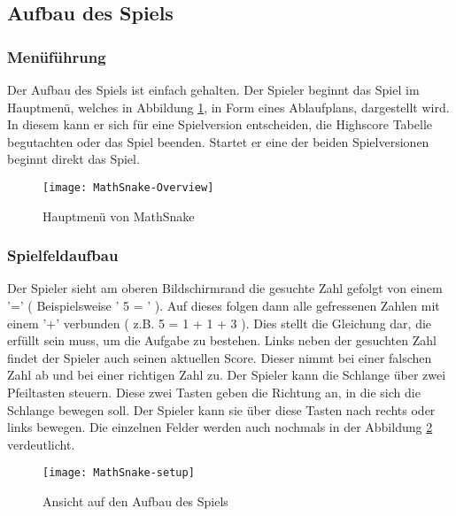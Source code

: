\subsection{Aufbau des Spiels}
\subsubsection{Menüführung}
Der Aufbau des Spiels ist einfach gehalten. Der Spieler beginnt das Spiel im Hauptmenü, welches in Abbildung \ref{fig:mathsnake-menu}, in Form eines Ablaufplans, dargestellt wird. In diesem kann er sich für eine Spielversion entscheiden, die Highscore Tabelle begutachten oder das Spiel beenden. Startet er eine der beiden Spielversionen beginnt direkt das Spiel. 
\begin{figure}[htb]
	\centering
	\texttt{[image: MathSnake-Overview]}
	\caption{Hauptmenü von MathSnake\label{fig:mathsnake-menu}}
\end{figure}
\subsubsection{Spielfeldaufbau}
Der Spieler sieht am oberen Bildschirmrand die gesuchte Zahl gefolgt von einem '=' ( Beispielsweise ' 5 = ' ). Auf dieses folgen dann alle gefressenen Zahlen mit einem '+' verbunden ( z.B. 5 = 1 + 1 + 3 ). Dies stellt die Gleichung dar, die erfüllt sein muss, um die Aufgabe zu bestehen. Links neben der gesuchten Zahl findet der Spieler auch seinen aktuellen Score. Dieser nimmt bei einer falschen Zahl ab und bei einer richtigen Zahl zu. Der Spieler kann die Schlange über zwei Pfeiltasten steuern. Diese zwei Tasten geben die Richtung an, in die sich die Schlange bewegen soll. Der Spieler kann sie über diese Tasten nach rechts oder links bewegen. Die einzelnen Felder werden auch nochmals in der Abbildung \ref{fig:mathsnake-setup} verdeutlicht.
\begin{figure}[htb]
	\centering
	\texttt{[image: MathSnake-setup]}
	\caption{Ansicht auf den Aufbau des Spiels\label{fig:mathsnake-setup}}
\end{figure}
